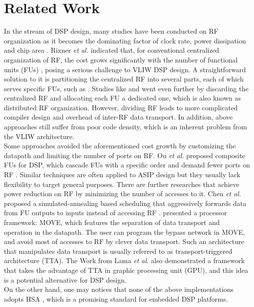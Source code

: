 \chapter{Related Work}
\label{cha:related}
    In the stream of DSP design, many studies have been conducted on RF organization as it becomes the dominating factor of clock rate, power dissipation and chip area \cite{register}.
    Rixner \textit{et al.} indicated that, for conventional centralized organization of RF, the cost grows significantly with the number of functional units (FUs) \cite{register}, posing a serious challenge to VLIW DSP design.
    A straightforward solution to it is partitioning the centralized RF into several parts, each of which serves specific FUs, such as \cite{cluster}.
    Studies like \cite{synzen} and \cite{dsplite} went even further by discarding the centralized RF and allocating each FU a dedicated one, which is also known as distributed RF organization.
    However, dividing RF leads to more complicated compiler design and overhead of inter-RF data transport.
    In addition, above approaches still suffer from poor code density, which is an inherent problem from the VLIW architecture.
    \\\indent
    Some approaches avoided the aforementioned cost growth by customizing the datapath and limiting the number of ports on RF.
    Ou \textit{et al.} proposed composite FUs for DSP, which cascade FUs with a specific order and demand fewer ports on RF \cite{cascade} \cite{hearaid}.
    Similar techniques are often applied to ASIP design but they usually lack flexibility to target general purposes.
    There are further researches that achieve power reduction on RF by minimizing the number of accesses to it.
    Chen \textit{et al.} proposed a simulated-annealing based scheduling that aggressively forwards data from FU outputs to inputs instead of accessing RF \cite{multistage}.
    \cite{move} presented a processor framework: MOVE, which features the separation of data transport and operation in the datapath. 
    The user can program the bypass network in MOVE, and avoid most of accesses to RF by clever data transport.
    Such an architecture that manipulates data transport is usually referred to as transport-triggered architecture (TTA).
    The Work from Lama \textit{et al.} \cite{ttagpu} also demonstrated a framework that takes the advantage of TTA in graphic processing unit (GPU), and this idea is a potential alternative for DSP design.
    \\\indent
    On the other hand, one may notices that none of the above implementations adopts HSA \cite{systemspec}, which is a promising standard for embedded DSP platforms.
